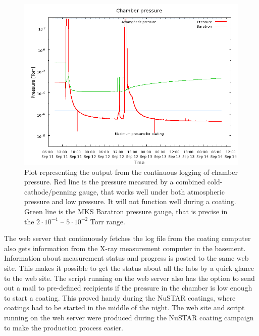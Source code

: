 \begin{figure}[htbp]
  \centering
    \includegraphics[width=0.8\linewidth]{figures/chamber/pressure.png}
  \caption{\footnotesize Plot representing the output from the continuous logging of chamber pressure. Red line is the pressure measured by a combined cold-cathode/penning gauge, that works well under both atmospheric pressure and low pressure. It will not function well during a coating. Green line is the MKS Baratron pressure gauge, that is precise in the $2\cdot10^{-4}$ -- $5\cdot10^{-2}$ Torr range.}
  \label{fig:chamber_pressure}
\end{figure}

The web server that continuously fetches the log file from the coating computer also gets information from the X-ray measurement computer in the basement. Information about measurement status and progress is posted to the same web site. This makes it possible to get the status about all the labs by a quick glance to the web site. The script running on the web server also has the option to send out a mail to pre-defined recipients if the pressure in the chamber is low enough to start a coating. This proved handy during the NuSTAR coatings, where coatings had to be started in the middle of the night. The web site and script running on the web server were produced during the NuSTAR coating campaign to make the production process easier.


